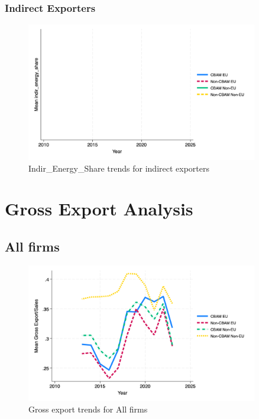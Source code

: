 \documentclass{article}
\begin{document}
\subsubsection{Indirect Exporters}
\begin{figure}[h!]
\centering
\includegraphics[width=0.9\textwidth]{indir_energy_share_indir.png}
\caption{Indir_Energy_Share trends for indirect exporters}
\label{fig:indir_energy_share_indir}
\end{figure}

\section{Gross Export Analysis}
\subsection{All firms}
\begin{figure}[h!]
\centering
\includegraphics[width=0.9\textwidth]{gross_all.png}
\caption{Gross export trends for All firms}
\label{fig:gross_all}
\end{figure}
\end{document}
